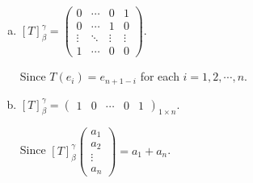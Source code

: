 \begin{Exercise}
\begin{enumerate}[(a)]
\item
\begin{answer}
$[T]_{\beta}^{\gamma} = \begin{pmatrix}
0 & \cdots & 0 & 1 \\
0 & \cdots & 1 & 0 \\
\vdots & \ddots & \vdots & \vdots \\
1 & \cdots & 0 & 0
\end{pmatrix}$.
\end{answer}
\begin{solution}
Since $T(e_i) = e_{n+1-i}$ for each $i=1,2,\cdots,n$.
\end{solution}

\item
\begin{answer}
$[T]_{\beta}^{\gamma} = \begin{pmatrix}
1 & 0 & \cdots & 0 & 1
\end{pmatrix}_{1\times n}$.
\end{answer}
\begin{solution}
Since
$[T]_{\beta}^{\gamma}\begin{pmatrix}
a_1 \\
a_2 \\
\vdots \\
a_n
\end{pmatrix}
= a_1+a_n$.
\end{solution}
\end{enumerate}
\end{Exercise}